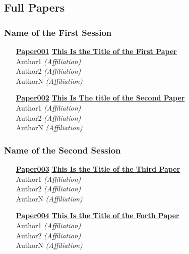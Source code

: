 
\subsection{Full Papers}
\subsubsection{Name of the First Session}

\begin{enumerate}
\item[\href{https://doi.org/10.1145/1122445.1122456}{\textbf{Paper001}}]
\href{https://doi.org/10.1145/1122445.1122456}{\textbf{This Is the Title of the First Paper}}\\
Author1 \emph{(Affiliation)}\\
Author2 \emph{(Affiliation)}\\
AuthorN \emph{(Affiliation)}\\

\item[\href{https://doi.org/10.1145/1122445.1122456}{\textbf{Paper002}}]
\href{https://doi.org/10.1145/1122445.1122456}{\textbf{This Is The title of the Second Paper}}\\
Author1 \emph{(Affiliation)}\\
Author2 \emph{(Affiliation)}\\
AuthorN \emph{(Affiliation)}\\
\end{enumerate}

\subsubsection{Name of the Second Session}
\begin{enumerate}
\item[\href{https://doi.org/10.1145/1122445.1122456}{\textbf{Paper003}}]
\href{https://doi.org/10.1145/1122445.1122456}{\textbf{This Is the Title of the Third Paper}}\\
Author1 \emph{(Affiliation)}\\
Author2 \emph{(Affiliation)}\\
AuthorN \emph{(Affiliation)}\\

\item[\href{https://doi.org/10.1145/1122445.1122456}{\textbf{Paper004}}]
\href{https://doi.org/10.1145/1122445.1122456}{\textbf{This Is the Title of the Forth Paper}}\\
Author1 \emph{(Affiliation)}\\
Author2 \emph{(Affiliation)}\\
AuthorN \emph{(Affiliation)}\\
\end{enumerate}


